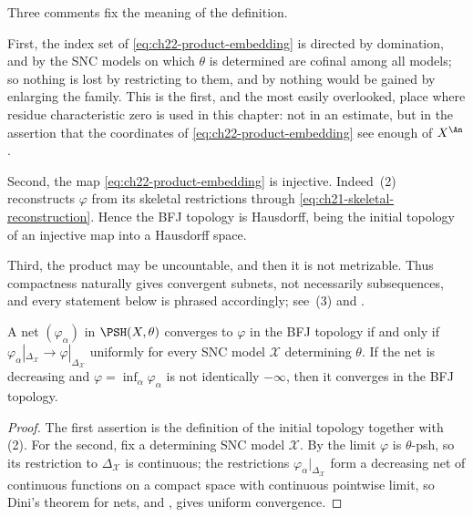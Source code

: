 Three comments fix the meaning of the definition.

First, the index set of \eqref{eq:ch22-product-embedding} is directed by
domination, and by  the SNC models on which
\(\theta\) is determined are cofinal among all models; so nothing is lost by
restricting to them, and by  nothing
would be gained by enlarging the family.  This is the first, and the most
easily overlooked, place where residue characteristic zero is used in this
chapter: not in an estimate, but in the assertion that the coordinates of
\eqref{eq:ch22-product-embedding} see enough of \(X^{\An}\).

Second, the map \eqref{eq:ch22-product-embedding} is injective.  Indeed
\,(2) reconstructs \(\varphi\) from
its skeletal restrictions through
\eqref{eq:ch21-skeletal-reconstruction}.  Hence the BFJ topology is
Hausdorff, being the initial topology of an injective map into a Hausdorff
space.

Third, the product may be uncountable, and then it is not metrizable.  Thus
compactness naturally gives convergent subnets, not necessarily
subsequences, and every statement below is phrased accordingly; see
\,(3) and .

\begin{lemma}
\label{lem:ch22-convergence-criterion}
A net \((\varphi_\alpha)\) in \(\PSH(X,\theta)\) converges to \(\varphi\) in
the BFJ topology if and only if
\(\varphi_\alpha|_{\Delta_{\mathcal X}}\to\varphi|_{\Delta_{\mathcal X}}\)
uniformly for every SNC model \(\mathcal X\) determining \(\theta\).  If the
net is decreasing and \(\varphi=\inf_\alpha\varphi_\alpha\) is not
identically \(-\infty\), then it converges in the BFJ topology.
\end{lemma}

\begin{proof}
The first assertion is the definition of the initial topology together with
\,(2).  For the second, fix a determining SNC model
\(\mathcal X\).  By  the limit
\(\varphi\) is \(\theta\)-psh, so its restriction to
\(\Delta_{\mathcal X}\) is continuous; the restrictions
\(\varphi_\alpha|_{\Delta_{\mathcal X}}\) form a decreasing net of
continuous functions on a compact space with continuous pointwise limit, so
Dini's theorem for nets,  and
, gives uniform convergence.
\end{proof}


